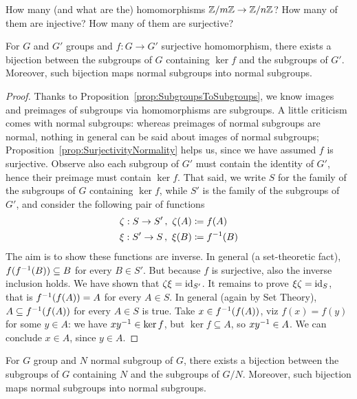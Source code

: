 \begin{exercise}
How many (and what are the) homomorphisms \(\mathbb Z/m\mathbb Z \to \mathbb Z/n\mathbb Z\)? How many of them are injective? How many of them are surjective?
\end{exercise}

\begin{proposition}
For \(G\) and \(G'\) groups and \(f : G \to G'\) surjective homomorphism, there exists a bijection between the subgroups of \(G\) containing \(\ker f\) and the subgroups of \(G'\). Moreover, such bijection maps normal subgroups into normal subgroups.
\end{proposition}

\begin{proof}
Thanks to Proposition~\ref{prop:SubgroupsToSubgroups}, we know images and preimages of subgroups via homomorphisms are subgroups. A little criticism comes with normal subgroups: whereas preimages of normal subgroups are normal, nothing in general can be said about images of normal subgroups; Proposition~\ref{prop:SurjectivityNormality} helps us, since we have assumed \(f\) is surjective. Observe also each subgroup of \(G'\) must contain the identity of \(G'\), hence their preimage must contain \(\ker f\).\newline
That said, we write \(S\) for the family of the subgroups of \(G\) containing \(\ker f\), while \(S'\) is the family of the subgroups of \(G'\), and consider the following pair of functions
\begin{align*}
& \zeta : S \to S'\,,\ \zeta(A) \coloneq f(A) \\
& \xi : S' \to S\,, \ \xi(B) \coloneq f^{-1}(B)
\end{align*}
The aim is to show these functions are inverse.\newline
In general (a set-theoretic fact), \(f(f^{-1}(B)) \subseteq B\) for every \(B \in S'\). But because \(f\) is surjective, also the inverse inclusion holds. We have shown that \(\zeta \xi = \text{id}_{S'}\).\newline
It remains to prove \(\xi \zeta = \text{id}_S\), that is \(f^{-1}(f(A)) = A\) for every \(A \in S\). In general (again by Set Theory), \(A \subseteq f^{-1}(f(A))\) for every \(A \in S\) is true. Take \(x \in f^{-1}(f(A))\), viz \(f(x) = f(y)\) for some \(y \in A\): we have \(xy^{-1} \in \ker f\), but \(\ker f \subseteq A\), so \(x y^{-1} \in A\). We can conclude \(x \in A\), since \(y \in A\). 
\end{proof}

\begin{corollary}
For \(G\) group and \(N\) normal subgroup of \(G\), there exists a bijection between the subgroups of \(G\) containing \(N\) and the subgroups of \(G/N\). Moreover, such bijection maps normal subgroups into normal subgroups.
\end{corollary}

